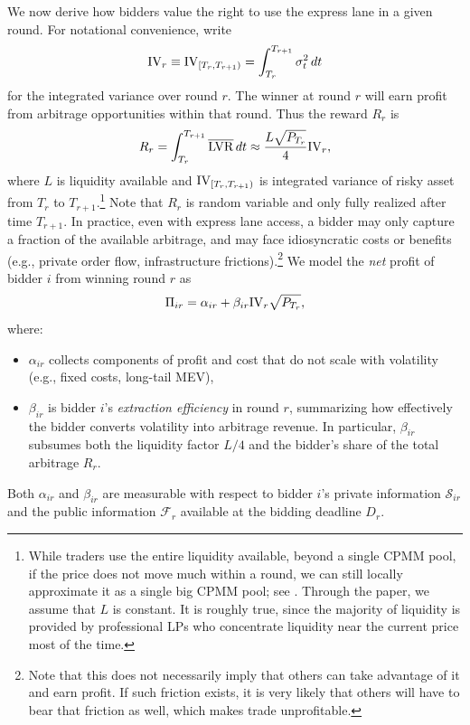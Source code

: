 We now derive how bidders value the right to use the express lane in a given
round. For notational convenience, write
\[
  \mathrm{IV}_r \equiv \mathrm{IV}_{[T_r, T_{r+1})}
  = \int_{T_r}^{T_{r+1}} \sigma_t^2 \, dt
\]
for the integrated variance over round $r$. The winner at round \(r\) will earn profit from arbitrage opportunities within that round. Thus the reward \(R_r\) is \[
R_r = \int^{T_{r+1}}_{T_r} \overline{\mathrm{LVR}} \, dt \approx \frac{L\sqrt{P_{T_r}}}{4} \mathrm{IV}_r,
\] where \(L\) is liquidity available and \(\mathrm{IV}_{[T_r, T_{r+1})}\) is integrated variance of risky asset from \(T_r\) to \(T_{r + 1}\).\footnote{While traders use the entire liquidity available, beyond a single CPMM pool, if the price does not move much within a round, we can still locally approximate it as a single big CPMM pool; see \cite{Dan2021UniswapV3Universal}. Through the paper, we assume that \(L\) is constant. It is roughly true, since the majority of liquidity is provided by professional LPs who concentrate liquidity near the current price most of the time.} Note that \(R_r\) is random variable and only fully realized after time \(T_{r+1}\). In practice, even with express lane access, a bidder may only capture a fraction of the available arbitrage, and may face idiosyncratic costs or benefits (e.g., private order flow, infrastructure frictions).\footnote{Note that this does not necessarily imply that others can take advantage of it and earn profit. If such friction exists, it is very likely that others will have to bear that friction as well, which makes trade unprofitable.} We model the \emph{net} profit of bidder $i$ from winning round $r$ as
\begin{equation}\label{eq:profit-def}
  \Pi_{ir}
  = \alpha_{ir} + \beta_{ir} \mathrm{IV}_r \sqrt{P_{T_r}},
\end{equation}
where:
\begin{itemize}
  \item $\alpha_{ir}$ collects components of profit and cost that do not scale with volatility (e.g., fixed costs, long-tail MEV),
  \item $\beta_{ir}$ is bidder $i$'s \emph{extraction efficiency} in round $r$, summarizing how effectively the bidder converts volatility into arbitrage revenue. In particular, $\beta_{ir}$ subsumes both the liquidity factor $L/4$ and the bidder's share of the total arbitrage $R_r$.
\end{itemize}
Both $\alpha_{ir}$ and $\beta_{ir}$ are measurable with respect to bidder $i$'s private information $\mathcal S_{ir}$ and the public information $\mathcal F_r$ available at the bidding deadline $D_r$.

